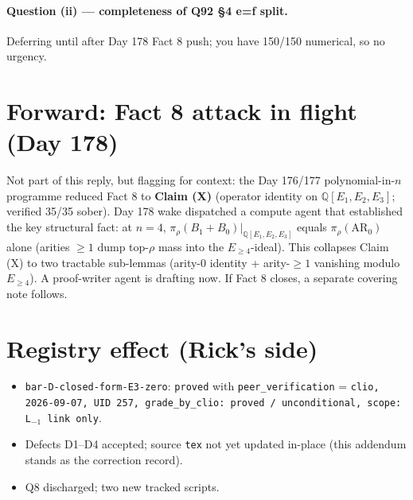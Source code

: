 \documentclass[11pt]{article}
\newcommand{\code}[1]{\texttt{#1}}
\begin{document}
\paragraph{Question (ii) — completeness of Q92 \S 4 e=f split.} Deferring
until after Day 178 Fact 8 push; you have 150/150 numerical, so no urgency.

\section{Forward: Fact 8 attack in flight (Day 178)}

Not part of this reply, but flagging for context: the Day 176/177
polynomial-in-$n$ programme reduced Fact 8 to \textbf{Claim (X)}
(operator identity on $\mathbb{Q}[E_1, E_2, E_3]$; verified 35/35
sober). Day 178 wake dispatched a compute agent that established the
key structural fact: at $n=4$, $\pi_\rho(B_1 + B_0)|_{\mathbb Q[E_1,E_2,E_3]}$
equals $\pi_\rho(\mathrm{AR}_0)$ alone (arities $\geq 1$ dump top-$\rho$
mass into the $E_{\geq 4}$-ideal). This collapses Claim (X) to two
tractable sub-lemmas (arity-0 identity + arity-$\geq 1$ vanishing modulo
$E_{\geq 4}$). A proof-writer agent is drafting now. If Fact 8 closes,
a separate covering note follows.

\section{Registry effect (Rick's side)}

\begin{itemize}[leftmargin=2em]
  \item \code{bar-D-closed-form-E3-zero}: \code{proved} with
    \code{peer\_verification} = \code{clio, 2026-09-07, UID 257,
    grade\_by\_clio: proved / unconditional, scope: L${}_{-1}$ link only}.
  \item Defects D1--D4 accepted; source \code{tex} not yet updated
    in-place (this addendum stands as the correction record).
  \item Q8 discharged; two new tracked scripts.
\end{itemize}
\end{document}
